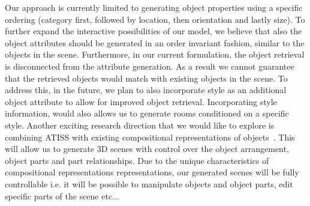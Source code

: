 \documentclass{article}
\makeatletter
\DeclareRobustCommand\onedot{\futurelet\@let@token\@onedot}
\def\@onedot{\ifx\@let@token.\else.\null\fi\xspace}
\def\etc{etc\onedot}
\makeatother
\begin{document}
Our approach is currently limited to generating object properties using a
specific ordering (category first, followed by location, then orientation and
lastly size). To further expand the interactive possibilities of our model, we
believe that also the object attributes should be generated in an order
invariant fashion, similar to the objects in the scene. Furthermore, in our
current formulation, the object retrieval is disconnected from the attribute
generation. As a result we cannot guarantee that the retrieved objects would
match with existing objects in the scene. To address this, in the future, we
plan to also incorporate style as an additional object attribute to allow for
improved object retrieval. Incorporating style information, would also allows
us to generate rooms conditioned on a specific style. Another exciting research
direction that we would like to explore is combining ATISS with existing
compositional representations of objects~\cite{Tulsiani2017CVPRa,
Paschalidou2019CVPR, Mo2019SIGGRAPH, Paschalidou2020CVPR, Paschalidou2021CVPR,
Mo2021ICCV}. This will allow us to generate 3D scenes with control over the
object arrangement, object parts and part relationships. Due to the unique
characteristics of compositional representations representations, our generated
scenes will be fully controllable i.e. it will be possible to manipulate
objects and object parts, edit specific parts of the scene \etc.
\end{document}
